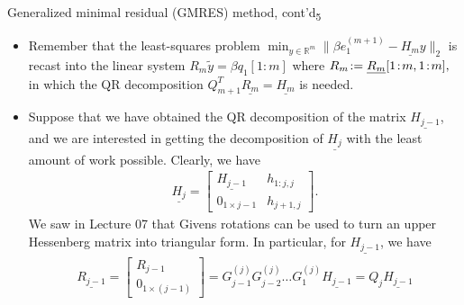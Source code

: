 \documentclass[t,usepdftitle=false]{beamer}
\begin{document}
\begin{frame}{Generalized minimal residual (GMRES) method, cont'd\textsubscript{5}}
\begin{itemize}
\item Remember that the least-squares problem $\min_{y\in\mathbb{R}^m}\|\beta e_1^{(m+1)}-\underline{H_m}y\|_2$ is recast into the linear system $R_m\tilde{y}=\beta q_1[1\!:\!m]$ where $R_m\!:=\underline{R_m}[1\!:\!m,1\! :\!m],\hspace{-1cm}$\\ 
in which the QR decomposition $Q_{m+1}^T\underline{R_m}=\underline{H_m}$ is needed.
\item[] Suppose that we have obtained the QR decomposition of the matrix $\underline{H_{j-1}}$, and we are interested in getting the decomposition of $\underline{H_j}$ with the least amount of work possible.
Clearly, we have
\begin{align*}
\underline{H_j}=
\begin{bmatrix}
\underline{H_{j-1}}&h_{1:j,j}\\
0_{1\times j-1}&h_{j+1,j}
\end{bmatrix}.
\end{align*}
We saw in Lecture 07 that Givens rotations can be used to turn an upper Hessenberg matrix into triangular form.
In particular, for $\underline{H_{j-1}}$, we have
\begin{align*}
\underline{R_{j-1}}=
\begin{bmatrix}
R_{j-1}\\
0_{1\times (j-1)}
\end{bmatrix}=
G_{j-1}^{(j)}G^{(j)}_{j-2}\dots G^{(j)}_1\underline{H_{j-1}}=Q_j\underline{H_{j-1}}
\end{align*}
\end{itemize}
\end{frame}
\end{document}
